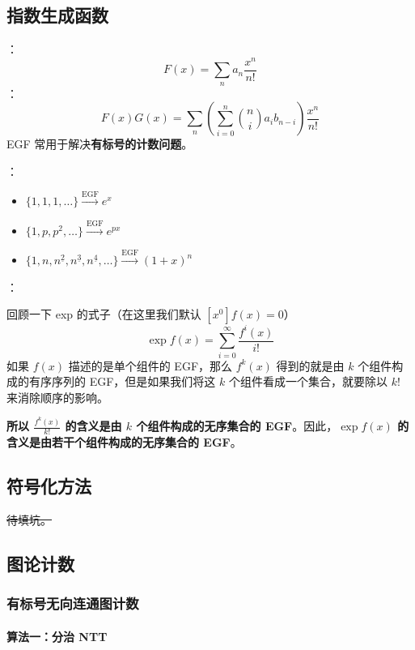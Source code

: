 \subsection{指数生成函数}

：
\[
F(x) = \sum_{n} a_n \frac{x^n}{n!}
\]
：
\[
F(x)G(x) = \sum_{n} \left( \sum_{i = 0}^n \binom{n}{i}a_ib_{n - i} \right)\frac{x^n}{n!}
\]
EGF 常用于解决\textbf{有标号的计数问题}。

：

\begin{itemize}
    \item $\{1, 1, 1, \dots\} \xrightarrow{\mathrm{EGF}} e^x$
    \item $\{1, p, p^2, \dots\} \xrightarrow{\mathrm{EGF}} e^{px}$
    \item $\{1, n, n^{\underline{2}}, n^{\underline{3}}, n^{\underline{4}}, \dots \} \xrightarrow{\mathrm{EGF}} (1 + x)^n$
\end{itemize}

：

回顾一下 exp 的式子（在这里我们默认 $[x^0]f(x) = 0$）
\[
\exp f(x) = \sum\limits_{i = 0}^{\infty} \frac{f^i(x)}{i!}
\]
如果 $f(x)$ 描述的是单个组件的 EGF，那么 $f^k(x)$ 得到的就是由 $k$ 个组件构成的有序序列的 EGF，但是如果我们将这 $k$ 个组件看成一个集合，就要除以 $k!$ 来消除顺序的影响。

\textbf{所以 $\frac{f^k(x)}{k!}$ 的含义是由 $k$ 个组件构成的无序集合的 EGF}。因此，\textbf{$\exp f(x)$ 的含义是由若干个组件构成的无序集合的 EGF}。

\subsection{符号化方法}

\sout{待填坑。}

\subsection{图论计数}

\subsubsection{有标号无向连通图计数}

\paragraph{算法一：分治 NTT}

